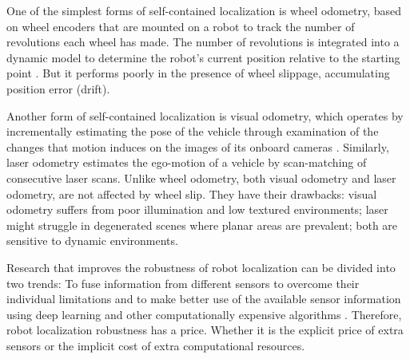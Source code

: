 One of the simplest forms of self-contained localization is wheel odometry,
based on wheel encoders that are mounted on a robot to track the number of
revolutions each wheel has made. The number of revolutions is integrated into a
dynamic model to determine the robot's current position relative to the
starting point \cite{OdometrySurvey}. But it performs poorly in the presence of
wheel slippage, accumulating position error (drift).

Another form of self-contained localization is visual odometry, which operates
by incrementally estimating the pose of the vehicle through examination of the
changes that motion induces on the images of its onboard cameras
\cite{ScaramuzzaTutorial}. Similarly, laser odometry estimates the ego-motion
of a vehicle by scan-matching of consecutive laser scans. Unlike wheel
odometry, both visual odometry and laser odometry, are not affected by wheel
slip. They have their drawbacks: visual odometry suffers from poor illumination
and low textured environments; laser might struggle in degenerated scenes where
planar areas are prevalent; both are sensitive to dynamic environments.

Research that improves the robustness of robot localization can be divided into
two trends: To fuse information from different sensors to overcome their
individual limitations \cite{Valente2019,Vargas2021,Ojeda2006} and to make
better use of the available sensor information using deep learning and other
computationally expensive algorithms \cite{Long2021,DFVO}. Therefore, robot
localization robustness has a price. Whether it is the explicit price of extra
sensors or the implicit cost of extra computational resources.